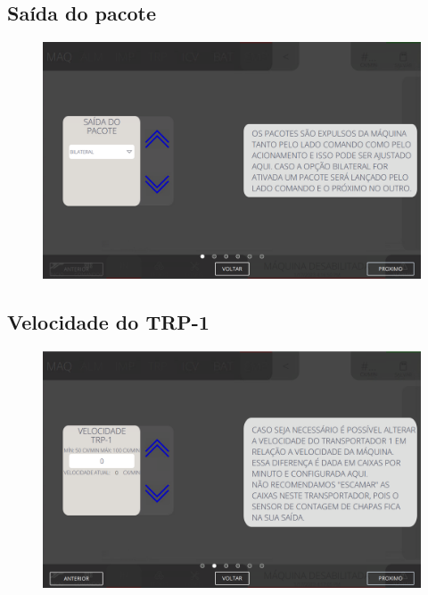 \thispagestyle{fancy}
\vspace{\fill}
\subsection{\small Saída do pacote}
\begin{figure}
    \centering
    \includegraphics[width=576 px,height=360 px]{src/imagesICV/08-stacker/settings/1.png}
\end{figure}

\newpage
\thispagestyle{fancy}
\vspace{\fill}

\subsection{\small Velocidade do TRP-1}
\begin{figure}
    \centering
    \includegraphics[width=576 px,height=360 px]{src/imagesICV/08-stacker/settings/2.png}
\end{figure}


